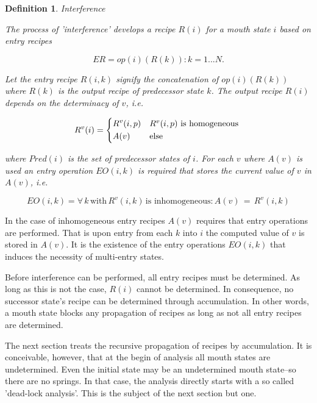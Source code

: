 \documentclass[12pt,a4paper]{scrartcl}
\newtheorem{definition}{Definition}
\begin{document}
\begin{definition}
Interference

The process of 'interference' develops a recipe $R(i)$ for a mouth state
$i$ based on entry recipes 

\begin{equation}
              ER = { op(i)(R(k)): k = 1...N }. 
\end{equation}
              
Let the entry recipe $R(i,k)$ signify the concatenation of $op(i)(R(k))$
where $R(k)$ is the output recipe of predecessor state $k$. The output
recipe $R(i)$ depends on the determinacy of $v$, i.e. 
          
\begin{equation}
    R^v(i) = \begin{dcases*}
              R^v(i,p) & $R^v(i,p)$ is homogeneous \\
              A(v)     & else
             \end{dcases*}
\end{equation}

where $Pred(i)$ is the set of predecessor states of $i$. For each $v$ where
$A(v)$ is used an entry operation $EO(i,k)$ is required that stores the current
value of $v$ in $A(v)$, i.e.

\begin{equation}
    EO(i,k) = { \forall\,k\,\mbox{with}\,R^v(i,k)\,\mbox{is inhomogeneous}: A(v)\,=\,R^v(i,k) }
\end{equation}

\end{definition}

In the case of inhomogeneous entry recipes $A(v)$ requires that entry
operations are performed.  That is upon entry from each $k$ into $i$ the
computed value of $v$ is stored in $A(v)$.  It is the existence of the entry
operations $EO(i,k)$ that induces the necessity of multi-entry states.  

Before interference can be performed, all entry recipes must be determined.  As
long as this is not the case, $R(i)$ cannot be determined. In consequence, no
successor state's recipe can be determined through accumulation. In other
words,  a mouth state blocks any propagation of recipes as long as not all
entry recipes are determined. 

The next section treats the recursive propagation of recipes by accumulation.
It is conceivable, however, that at the begin of analysis all mouth states are
undetermined. Even the initial state may be an undetermined mouth state--so
there are no springs. In that case, the analysis directly starts with a so
called 'dead-lock analysis'. This is the subject of the next section but one.
\end{document}
